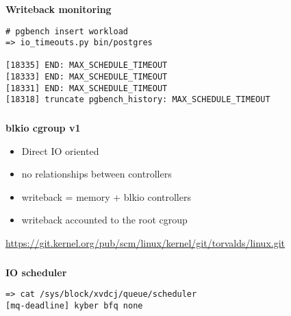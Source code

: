 \documentclass[usenames,dvipsnames, 18pt, compress, aspectratio=169]{beamer}
\begin{document}
\begin{frame}[fragile]{}
    \frametitle{}
    \begin{center}
        \textbf{Writeback monitoring}

        \begin{flushleft}
        \begin{verbatim}
# pgbench insert workload
=> io_timeouts.py bin/postgres

[18335] END: MAX_SCHEDULE_TIMEOUT
[18333] END: MAX_SCHEDULE_TIMEOUT
[18331] END: MAX_SCHEDULE_TIMEOUT
[18318] truncate pgbench_history: MAX_SCHEDULE_TIMEOUT
        \end{verbatim}
        \end{flushleft}

    \end{center}
\end{frame}

\begin{frame}
    \frametitle{}
    \begin{center}
    \textbf{blkio cgroup v1}

        \begin{itemize}[label={\MVRightarrow}]
            \item Direct IO oriented
            \item no relationships between controllers
            \item writeback = memory + blkio controllers
            \item writeback accounted to the root cgroup
        \end{itemize}

        \normalsize{\href{
            https://git.kernel.org/pub/scm/linux/kernel/git/torvalds/linux.git/commit/?h=v4.14-rc4&id=3e1534cf4a2a8278e811e7c84a79da1a02347b8b
        }{\color{black}https://git.kernel.org/pub/scm/linux/kernel/git/torvalds/linux.git}}

    \end{center}
\end{frame}

\begin{frame}[fragile]{}
    \frametitle{}
    \begin{center}
        \textbf{IO scheduler}

        \begin{flushleft}
		\begin{verbatim}
=> cat /sys/block/xvdcj/queue/scheduler
[mq-deadline] kyber bfq none
        \end{verbatim}
        \end{flushleft}

    \end{center}
\end{frame}
\end{document}
